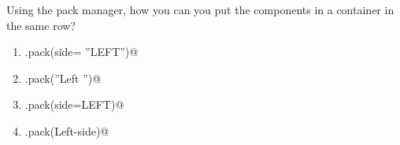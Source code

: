 \question
Using the pack manager, how you can you put the components in a container in the same row?

\begin{enumerate}
\item \lstinline@Component.pack(side= ''LEFT'')@
\item \lstinline@Component.pack(''Left '')@
\item \lstinline@Component.pack(side=LEFT)@
\item \lstinline@Component.pack(Left-side)@
\end{enumerate}

